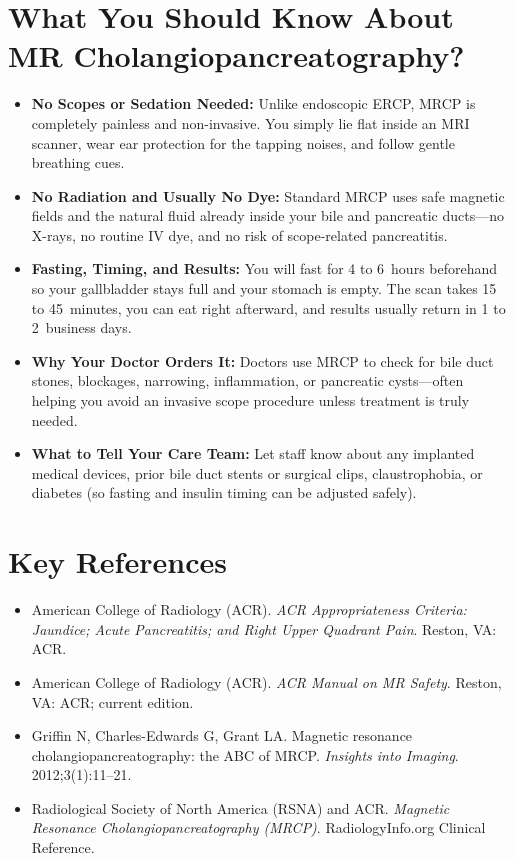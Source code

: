 \section{What You Should Know About MR Cholangiopancreatography?}
\begin{itemize}
\item \textbf{No Scopes or Sedation Needed:} Unlike endoscopic ERCP, MRCP is completely painless and non-invasive. You simply lie flat inside an MRI scanner, wear ear protection for the tapping noises, and follow gentle breathing cues.
\item \textbf{No Radiation and Usually No Dye:} Standard MRCP uses safe magnetic fields and the natural fluid already inside your bile and pancreatic ducts---no X-rays, no routine IV dye, and no risk of scope-related pancreatitis.
\item \textbf{Fasting, Timing, and Results:} You will fast for 4 to 6~hours beforehand so your gallbladder stays full and your stomach is empty. The scan takes 15 to 45~minutes, you can eat right afterward, and results usually return in 1 to 2~business days.
\item \textbf{Why Your Doctor Orders It:} Doctors use MRCP to check for bile duct stones, blockages, narrowing, inflammation, or pancreatic cysts---often helping you avoid an invasive scope procedure unless treatment is truly needed.
\item \textbf{What to Tell Your Care Team:} Let staff know about any implanted medical devices, prior bile duct stents or surgical clips, claustrophobia, or diabetes (so fasting and insulin timing can be adjusted safely).
\end{itemize}

\section{Key References}
\begin{itemize}
\item American College of Radiology (ACR). \textit{ACR Appropriateness Criteria: Jaundice; Acute Pancreatitis; and Right Upper Quadrant Pain}. Reston, VA: ACR.
\item American College of Radiology (ACR). \textit{ACR Manual on MR Safety}. Reston, VA: ACR; current edition.
\item Griffin N, Charles-Edwards G, Grant LA. Magnetic resonance cholangiopancreatography: the ABC of MRCP. \textit{Insights into Imaging}. 2012;3(1):11--21.
\item Radiological Society of North America (RSNA) and ACR. \textit{Magnetic Resonance Cholangiopancreatography (MRCP)}. RadiologyInfo.org Clinical Reference.
\end{itemize}
